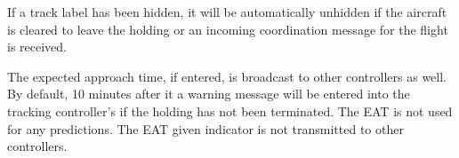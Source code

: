 \documentclass[a4paper,oneside,11pt]{memoir}
\begin{document}
If a track label has been hidden, it will be automatically unhidden if the aircraft is cleared to leave the holding or an incoming coordination message for the flight is received.

\bigskip

The expected approach time, if entered, is broadcast to other controllers as well. By default, 10 minutes after it a warning message will be entered into the tracking controller’s  if the holding has not been terminated. The EAT is not used for any predictions. The EAT given indicator is not transmitted to other controllers.

%
%
%
%
%
%
%
%
%
%
%
%
%
%
\end{document}
